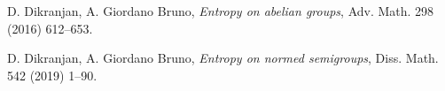 \documentclass[12pt]{article}
\theoremstyle{definition}
\numberwithin{equation}{section}
\begin{document}
\begin{thebibliography}{999}
{%
%
%
%
%
%
%
%
%
%
%
%


 {D. Dikranjan, A. Giordano Bruno}, \textit{Entropy on abelian groups}, Adv. Math. 298 (2016) 612--653.

 {D. Dikranjan, A. Giordano Bruno}, \textit{Entropy on normed semigroups}, Diss. Math. 542 (2019) 1--90.




}
\end{thebibliography}
\end{document}
